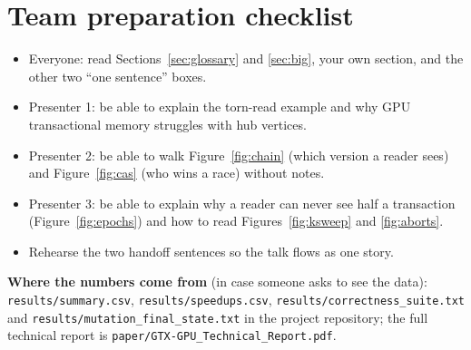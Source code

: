 \documentclass[11pt,a4paper]{article}
\newcommand{\code}[1]{\texttt{#1}}
\begin{document}
\section{Team preparation checklist}
\begin{itemize}
\item Everyone: read Sections~\ref{sec:glossary} and \ref{sec:big}, your own section, and the other two ``one sentence''
  boxes.
\item Presenter 1: be able to explain the torn-read example and why GPU transactional memory struggles with hub vertices.
\item Presenter 2: be able to walk Figure~\ref{fig:chain} (which version a reader sees) and Figure~\ref{fig:cas}
  (who wins a race) without notes.
\item Presenter 3: be able to explain why a reader can never see half a transaction (Figure~\ref{fig:epochs}) and how
  to read Figures~\ref{fig:ksweep} and \ref{fig:aborts}.
\item Rehearse the two handoff sentences so the talk flows as one story.
\end{itemize}

\textbf{Where the numbers come from} (in case someone asks to see the data): \code{results/summary.csv},
\code{results/speedups.csv}, \code{results/correctness\_suite.txt} and \code{results/mutation\_final\_state.txt} in the
project repository; the full technical report is \code{paper/GTX-GPU\_Technical\_Report.pdf}.
\end{document}
